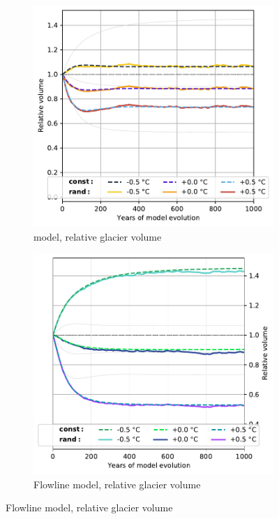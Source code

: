     \begin{figure}[htp]
      \centering
      \begin{subfigure}[b]{0.48\textwidth}
        \caption{\Vas{} model, relative glacier volume}
        \label{fig:histalp_commitment:volume_norm_const}
        \centering
        \includegraphics[width=\textwidth]{../plots/final_plots/time_series/histalp_commitment/volume_norm_vas.pdf}
      \end{subfigure}
      \hfill
      \begin{subfigure}[b]{0.48\textwidth}
        \caption{Flowline model, relative glacier volume}
        \label{fig:histalp_commitment:volume_norm_random}
        \centering
        \includegraphics[width=\textwidth]{../plots/final_plots/time_series/histalp_commitment/volume_norm_fl.pdf}

\end{subfigure}
\end{figure}
